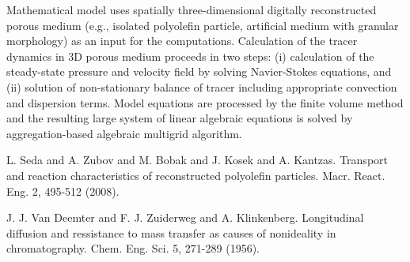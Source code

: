 Mathematical model uses spatially three-dimensional digitally reconstructed porous medium (e.g., isolated polyolefin particle, artificial medium with granular morphology) as an input for the computations. Calculation of the tracer dynamics in 3D porous medium proceeds in two steps: (i) calculation of the steady-state pressure and velocity field by solving Navier-Stokes equations, and (ii) solution of non-stationary balance of tracer including appropriate convection and dispersion terms. Model equations are processed by the finite volume method and the resulting large system of linear algebraic equations is solved by aggregation-based algebraic multigrid algorithm.


\begin{thebibliography}{10}

{\sc L. Seda and A. Zubov and M. Bobak and J. Kosek and A. Kantzas}. {Transport and reaction characteristics of reconstructed polyolefin particles}. Macr. React. Eng. 2, 495-512 (2008).



{\sc J. J. Van Deemter and F. J. Zuiderweg and A. Klinkenberg}. {Longitudinal diffusion and ressistance to mass transfer as causes of nonideality in chromatography}. Chem. Eng. Sci. 5, 271-289 (1956).

\end{thebibliography}
